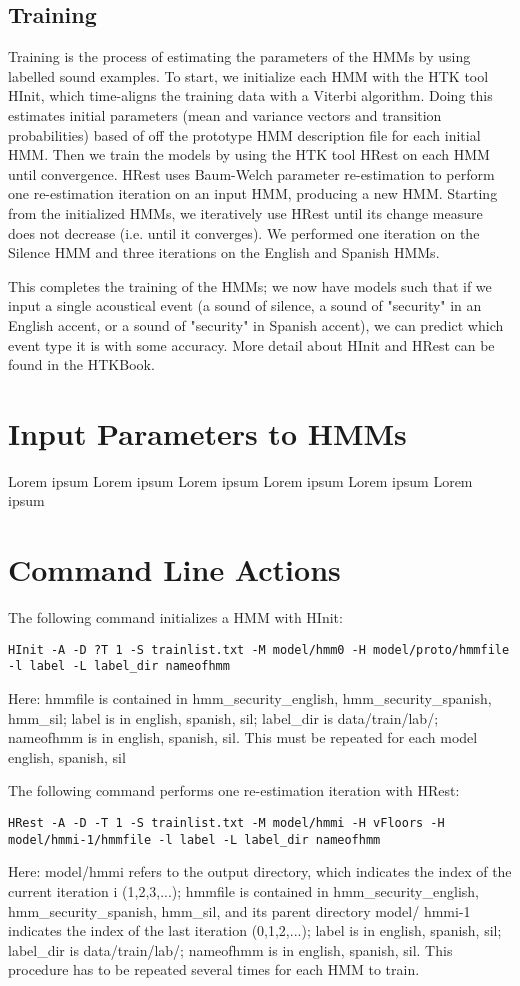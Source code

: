 \documentclass{wileySev}
\begin{document}
\subsection{Training}
Training is the process of estimating the parameters of the HMMs by using labelled sound examples. To start, we initialize each HMM with the HTK tool HInit, which time-aligns the training data with a Viterbi algorithm. Doing this estimates initial parameters (mean and variance vectors and transition probabilities) based of off the prototype HMM description file for each initial HMM. Then we train the models by using the HTK tool HRest on each HMM until convergence. HRest uses Baum-Welch parameter re-estimation to perform one re-estimation iteration on an input HMM, producing a new HMM. Starting from the initialized HMMs, we iteratively use HRest until its change measure does not decrease (i.e. until it converges). We performed one iteration on the Silence HMM and three iterations on the English and Spanish HMMs. 

This completes the training of the HMMs; we now have models such that if we input a single acoustical event (a sound of silence, a sound of "security" in an English accent, or a sound of "security" in Spanish accent), we can predict which event type it is with some accuracy. More detail about HInit and HRest can be found in the HTKBook.

\section{Input Parameters to HMMs} 
Lorem ipsum Lorem ipsum Lorem ipsum Lorem ipsum Lorem ipsum Lorem ipsum


\section{Command Line Actions}
The following command initializes a HMM with HInit:
\begin{verbatim}
HInit -A -D ?T 1 -S trainlist.txt -M model/hmm0 -H model/proto/hmmfile -l label -L label_dir nameofhmm
\end{verbatim}
Here: hmmfile is contained in {hmm\_security\_english, hmm\_security\_spanish, hmm\_sil}; label is in {english, spanish, sil}; label\_dir is data/train/lab/; nameofhmm is in {english, spanish, sil}.
This must be repeated for each model {english, spanish, sil}

The following command performs one re-estimation iteration with HRest:
\begin{verbatim}
HRest -A -D -T 1 -S trainlist.txt -M model/hmmi -H vFloors -H model/hmmi-1/hmmfile -l label -L label_dir nameofhmm
\end{verbatim}
Here: model/hmmi refers to the output directory, which indicates the index of the current iteration i (1,2,3,...); hmmfile is contained in {hmm\_security\_english, hmm\_security\_spanish, hmm\_sil}, and its parent directory model/
hmmi-1 indicates the index of the last iteration (0,1,2,...); label is in {english, spanish, sil}; label\_dir is data/train/lab/; nameofhmm is in {english, spanish, sil}.
This procedure has to be repeated several times for each HMM to train.
\end{document}
